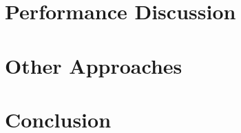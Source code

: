 \documentclass[12pt]{article}
\begin{document}
\section{Performance Discussion}

\section{Other Approaches}

\section{Conclusion}
\end{document}
